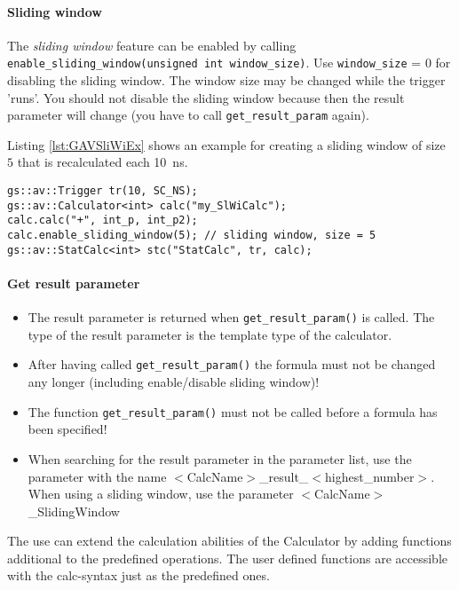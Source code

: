\paragraph{Sliding window}
The {\em sliding window} feature can be enabled by calling \lstinline[language=TeX]|enable_sliding_window(unsigned int window_size)|. Use \lstinline|window_size| = 0 for disabling the sliding window. The window size may be changed while the trigger 'runs'. You should not disable the sliding window because then the result parameter will change (you have to call \lstinline|get_result_param| again).

Listing \ref{lst:GAVSliWiEx} shows an example for creating a sliding window of size $5$ that is recalculated each 10~ns.

\noindent
\begin{minipage}{\textwidth}
\begin{lstlisting}[caption={
	Sliding window example: formula: $(inp\_p + inp\_p2)$, sliding window size: $5$}, label=lst:GAVSliWiEx]
gs::av::Trigger tr(10, SC_NS);
gs::av::Calculator<int> calc("my_SlWiCalc");
calc.calc("+", int_p, int_p2);
calc.enable_sliding_window(5); // sliding window, size = 5
gs::av::StatCalc<int> stc("StatCalc", tr, calc);
\end{lstlisting}
\end{minipage}

\paragraph{Get result parameter}
\begin{itemize}
  \item The result parameter is returned when \lstinline|get_result_param()| is called. The type of the result parameter is the template type of the calculator.
  \item After having called \lstinline|get_result_param()| the formula must not be changed any longer (including enable/disable sliding window)!
  \item The function \lstinline|get_result_param()| must not be called before a formula has been specified!
  \item When searching for the result parameter in the parameter list, use the parameter with the name \mbox{\sffamily $<$CalcName$>$\_result\_$<$highest\_number$>$}. When using a sliding window, use the parameter \mbox{\sffamily $<$CalcName$>$\_SlidingWindow}
\end{itemize}


The use can extend the calculation abilities of the \GreenAV Calculator by adding functions additional to the predefined operations. The user defined functions are accessible with the calc-syntax just as the predefined ones.

